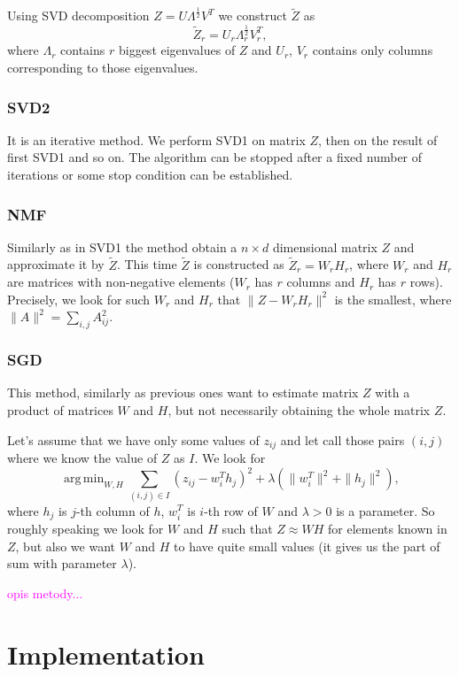 \documentclass[11pt]{amsart}
\DeclareMathOperator*{\argmin}{arg\,min}
\newcommand{\tami}[1]{{\textcolor{magenta}{#1}}}
\begin{document}
Using SVD decomposition $Z = U \Lambda^{\frac{1}{2}} V^T$ we construct $\tilde{Z}$ as
\[\tilde{Z}_r = U_r \Lambda_r^{\frac{1}{2}}V_r^T,\]
where $\Lambda_r$ contains $r$ biggest eigenvalues of $Z$ and $U_r$, $V_r$ contains only columns corresponding to those eigenvalues.

\subsubsection*{SVD2}

It is an iterative method.
We perform SVD1 on matrix $Z$, then on the result of first SVD1 and so on.
The algorithm can be stopped after a fixed number of iterations or some stop condition can be established.


\subsubsection*{NMF}

Similarly as in SVD1 the method obtain a $n \times d$ dimensional matrix $Z$ and approximate it by $\tilde{Z}$.
This time $\tilde{Z}$ is constructed as $\tilde{Z}_r = W_r H_r $, where $W_r$ and $H_r$ are matrices with non-negative elements ($W_r$ has $r$ columns and $H_r$ has $r$ rows).
Precisely, we look for such $W_r$ and $H_r$ that $\|Z - W_r H_r \|^2$ is the smallest, where $\|A\|^2 = \sum_{i, j} A_{ij}^2$.

\subsubsection*{SGD}

This method, similarly as previous ones want to estimate matrix $Z$ with a product of matrices
$W$ and $H$, but not necessarily obtaining the whole matrix $Z$.

Let's assume that we have only some values of $z_{ij}$ and let call those pairs $(i,j)$ where we know the value of $Z$ as $I$.
We look for
$$\argmin_{W, H} \sum_{(i,j)\in I} (z_{ij} - w_i^T h_j)^2 + \lambda(\|w_i^T\|^2 + \|h_j\|^2),$$
where $h_j$ is $j$-th column of $h$, $w_i^T$ is $i$-th row of $W$ and $\lambda > 0$ is a parameter.
So roughly speaking we look for $W$ and $H$ such that $Z \approx WH$ for elements known in $Z$, but also we want $W$ and $H$ to have quite small values (it gives us the part of sum with parameter $\lambda$).

\tami{opis metody...}

\section{Implementation}
\end{document}
